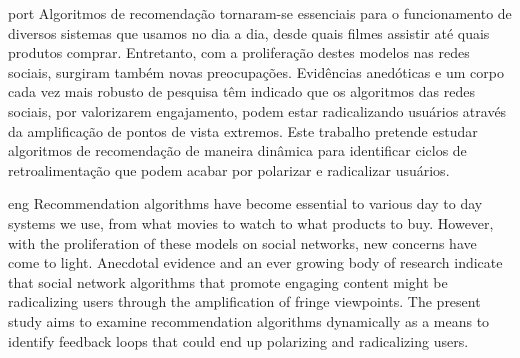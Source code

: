 
\begin{resumo}{port}
Algoritmos de recomendação tornaram-se essenciais para o funcionamento de
diversos sistemas que usamos no dia a dia, desde quais filmes assistir até quais
produtos comprar. Entretanto, com a proliferação destes modelos nas redes
sociais, surgiram também novas preocupações. Evidências anedóticas e um corpo
cada vez mais robusto de pesquisa têm indicado que os algoritmos das redes
sociais, por valorizarem engajamento, podem estar radicalizando usuários através
da amplificação de pontos de vista extremos. Este trabalho pretende estudar
algoritmos de recomendação de maneira dinâmica para identificar ciclos de
retroalimentação que podem acabar por polarizar e radicalizar usuários.
\end{resumo}

\begin{resumo}{eng}
Recommendation algorithms have become essential to various day to day systems we
use, from what movies to watch to what products to buy. However, with the
proliferation of these models on social networks, new concerns have come to
light. Anecdotal evidence and an ever growing body of research indicate that
social network algorithms that promote engaging content might be radicalizing
users through the amplification of fringe viewpoints. The present study aims to
examine recommendation algorithms dynamically as a means to identify feedback
loops that could end up polarizing and radicalizing users.
\end{resumo}
